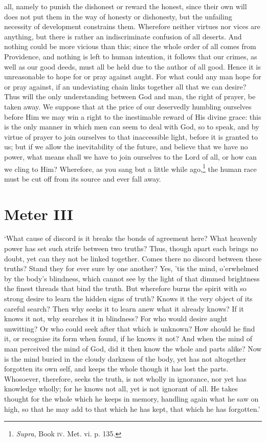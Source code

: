 all, namely to punish the dishonest or reward the honest, since their
own will does not put them in the way of  honesty or
dishonesty, but the unfailing necessity of development constrains
them. Wherefore neither virtues nor vices are anything, but there is
rather an indiscriminate confusion of all deserts. And nothing could
be more vicious than this; since the whole order of all comes from
Providence, and nothing is left to human intention, it follows that
our crimes, as well as our good deeds, must all be held due to the
author of all good. Hence it is unreasonable to hope for or pray
against aught. For what could any man hope for or pray against, if an
undeviating chain links together all that we can desire? Thus will
the only understanding between God and man, the right of prayer, be
taken away. We suppose that at the price of our deservedly humbling
ourselves before Him we may win a right to the inestimable reward of
His divine grace: this is the only manner in which men can seem to
deal with God, so to speak, and by virtue of prayer to join ourselves
to that inaccessible light, before it is granted to us; but if we
allow the inevitability of the future, and believe that we have no
power, what means shall we have to join ourselves to the Lord of all,
or how can we cling to Him? Wherefore, as you sang but a little while
ago,\footnote{\textit{Supra}, Book \textsc{iv}. Met. vi. p. 135.}
the human race must be cut off from its source and ever fall away.

\section*{Meter III}

`What cause of discord is it breaks the  bonds of agreement
here? What heavenly power has set such strife between two truths?
Thus, though apart each brings no doubt, yet can they not be linked
together. Comes there no discord between these truths? Stand they for
ever sure by one another? Yes, 'tis the mind, o'erwhelmed by the
body's blindness, which cannot see by the light of that dimmed
brightness the finest threads that bind the truth. But wherefore burns
the spirit with so strong desire to learn the hidden signs of truth?
Knows it the very object of its careful search? Then why seeks it to
learn anew what it already knows? If it knows it not, why searches it
in blindness? For who would desire aught unwitting? Or who could seek
after that which is unknown? How should he find it, or recognise its
form when found, if he knows it not? And when the mind of man
perceived the mind of God, did it then know the whole and parts alike?
Now is the mind buried in the cloudy darkness of the body, yet has not
altogether forgotten its own self, and keeps the whole though it has
lost the parts. Whosoever, therefore, seeks the truth, is not wholly
in ignorance, nor yet has knowledge wholly; for he knows not all, yet
is not ignorant of all. He takes thought for the whole which he keeps
in memory, handling again what he saw on high, so that he may add to
that which he has kept, that which he has forgotten.'


